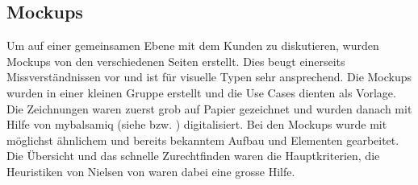 \FloatBarrier
\subsection{Mockups}\label{mockups}
Um auf einer gemeinsamen Ebene mit dem Kunden zu diskutieren, wurden Mockups von den verschiedenen Seiten erstellt. Dies beugt einerseits Missverständnissen vor und ist für visuelle Typen sehr ansprechend. Die Mockups wurden in einer kleinen Gruppe erstellt und die Use Cases dienten als Vorlage. Die Zeichnungen waren zuerst grob auf Papier gezeichnet und wurden danach mit Hilfe von mybalsamiq (siehe \cite{zhaw_mybalsamiq} bzw. \cite{mybalsamiq}) digitalisiert. Bei den Mockups wurde mit möglichst ähnlichem und bereits bekanntem Aufbau und Elementen gearbeitet. Die Übersicht und das schnelle Zurechtfinden waren die Hauptkriterien, die Heuristiken von Nielsen von \cite{paper_usability} waren dabei eine grosse Hilfe.

